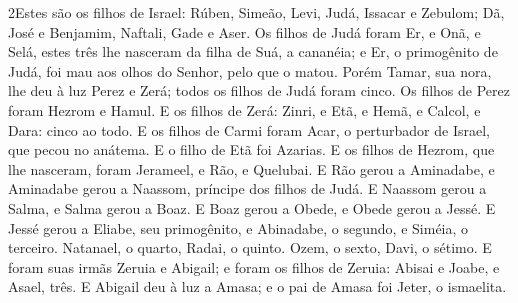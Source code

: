 \lettrine{2} Estes são os filhos de Israel: Rúben, Simeão,
Levi, Judá, Issacar e Zebulom; Dã, José e Benjamim, Naftali,
Gade e Aser. Os filhos de Judá foram Er, e Onã, e Selá, estes
três lhe nasceram da filha de Suá, a cananéia; e Er, o primogênito
de Judá, foi mau aos olhos do Senhor, pelo que o matou. Porém
Tamar, sua nora, lhe deu à luz Perez e Zerá; todos os filhos de Judá
foram cinco. Os filhos de Perez foram Hezrom e Hamul. E os
filhos de Zerá: Zinri, e Etã, e Hemã, e Calcol, e Dara: cinco ao
todo. E os filhos de Carmi foram Acar, o perturbador de Israel,
que pecou no anátema. E o filho de Etã foi Azarias. E os
filhos de Hezrom, que lhe nasceram, foram Jerameel, e Rão, e
Quelubai. E Rão gerou a Aminadabe, e Aminadabe gerou a
Naassom, príncipe dos filhos de Judá. E Naassom gerou a
Salma, e Salma gerou a Boaz. E Boaz gerou a Obede, e Obede
gerou a Jessé. E Jessé gerou a Eliabe, seu primogênito, e
Abinadabe, o segundo, e Siméia, o terceiro. Natanael, o
quarto, Radai, o quinto. Ozem, o sexto, Davi, o sétimo.
E foram suas irmãs Zeruia e Abigail; e foram os filhos de
Zeruia: Abisai e Joabe, e Asael, três. E Abigail deu à luz a
Amasa; e o pai de Amasa foi Jeter, o ismaelita.


